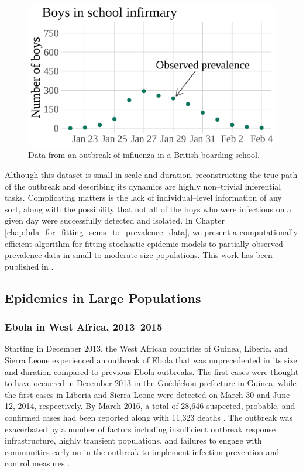 \begin{figure}[htbp]
	\centering
	\includegraphics[width=0.6\linewidth]{figures/bbs_data}
	\caption{Data from an outbreak of influenza in a British boarding school.}
	\label{fig:bbsdata}
\end{figure}

Although this dataset is small in scale and duration, reconstructing the true path of the outbreak and describing its dynamics are highly non--trivial inferential tasks. Complicating matters is the lack of individual--level information of any sort, along with the possibility that not all of the boys who were infectious on a given day were successfully detected and isolated. In Chapter  \ref{chap:bda_for_fitting_sems_to_prevalence_data}, we present a computationally efficient algorithm for fitting stochastic epidemic models to partially observed prevalence data in small to moderate size populations. This work has been published in \cite{fintzi2017efficient}. 

\subsection{Epidemics in Large Populations}
\label{subsec:largepop}

\subsubsection{Ebola in West Africa, 2013--2015}
\label{subsec:ebola_descrip}

Starting in December 2013, the West African countries of Guinea, Liberia, and Sierra Leone experienced an outbreak of Ebola that was unprecedented in its size and duration compared to previous Ebola outbreaks. The first cases were thought to have occurred in December 2013 in the Gu\'{e}d\'{e}ckou prefecture in Guinea, while the first cases in Liberia and Sierra Leone were detected on March 30 and June 12, 2014, respectively. By March 2016, a total of 28,646 suspected, probable, and confirmed cases had been reported along with 11,323 deaths \cite{who2016situation}. The outbreak was exacerbated by a number of factors including insufficient outbreak response infrastructure, highly transient populations, and failures to engage with communities early on in the outbreak to implement infection prevention and control measures \cite{coltart2017ebola,dudas2017virus}. 


